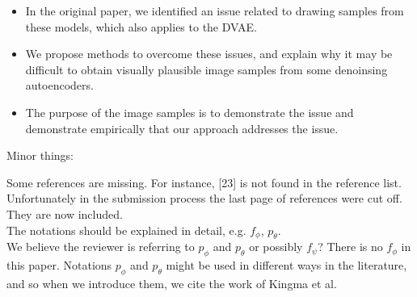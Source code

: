 \documentclass{article}
\begin{document}
\begin{itemize}
    \item In the original paper, we identified an issue related to drawing samples from these models, which also applies to the DVAE.
    \item We propose methods to overcome these issues, and explain why it may be difficult to obtain visually plausible image samples from some denoinsing autoencoders.
    \item {\color{red} The purpose of the image samples is to demonstrate the issue and demonstrate empirically that our approach addresses the issue.}
\end{itemize}

% 



Minor things: \newline

{\color{blue}
Some references are missing. For instance, [23] is not found in the reference list.}\\

Unfortunately in the submission process the last page of references were cut off. They are now included.\\

{\color{blue}
The notations should be explained in detail, e.g. $f_\phi$, $p_\theta$.} \\

We believe the reviewer is referring to $p_\phi$ and $p_\theta$ or possibly $f_\psi$? There is no $f_\phi$ in this paper. Notations $p_\phi$ and $p_\theta$ might be used in different ways in the literature, and so when we introduce them, we cite the work of Kingma et al.\\
\end{document}
